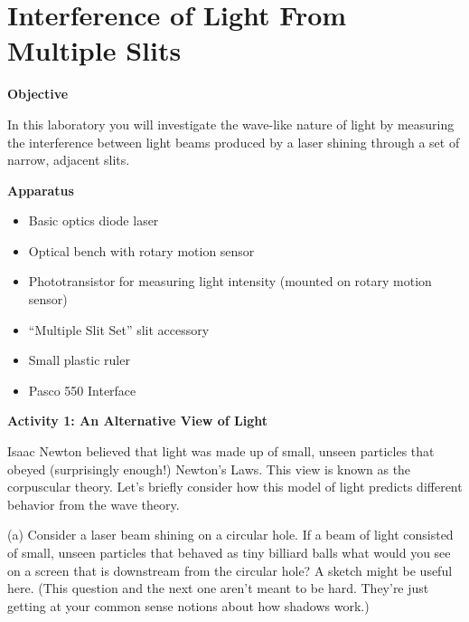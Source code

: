 
\section{Interference of Light From Multiple Slits}
\label{interference_lab}
\makelabheader %

\textbf{Objective}

In this laboratory you will investigate the wave-like nature of light by measuring the interference 
between light beams produced by a laser shining through a set of narrow, adjacent
slits. 

\textbf{Apparatus}

\begin{itemize}
\item Basic optics diode laser
\item Optical bench with rotary motion sensor
\item Phototransistor for measuring light intensity (mounted on rotary motion sensor)
\item ``Multiple Slit Set'' slit accessory
\item Small plastic ruler
\item Pasco 550 Interface
\end{itemize}


\textbf{Activity 1: An Alternative View of Light}

Isaac Newton believed that light was made up of small, unseen particles
that obeyed (surprisingly enough!) Newton's Laws. This view is known
as the corpuscular theory. Let's briefly consider how this model of light
predicts different behavior from the wave theory.

(a) Consider a laser beam shining on a circular hole. If a beam of
light consisted of small, unseen particles that behaved as tiny billiard
balls what would you see on a screen that is downstream from the circular
hole? A sketch might be useful here.  (This question and the next one aren't meant to be hard.
They're just getting at your common sense notions about how shadows work.)
\answerspace{35mm}

